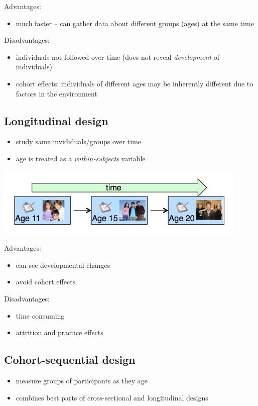 \documentclass[11pt]{article}
\begin{document}
Advantages:
\begin{itemize}
\item much faster -- can gather data about different groups (ages) at the same time
\end{itemize}

Disadvantages:
\begin{itemize}
\item individuals not followed over time (does not reveal \emph{development} of individuals)
\item cohort effects: individuals of different ages may be inherently different due to factors in the environment
\end{itemize}

\subsection*{Longitudinal design}
\label{sec-1-2}
\begin{itemize}
\item study same invididuals/groups over time
\item age is treated as a \emph{within-subjects} variable
\end{itemize}

\includegraphics[width=.9\linewidth]{figures/long.jpg}

Advantages:
\begin{itemize}
\item can see developmental changes
\item avoid cohort effects
\end{itemize}

Disadvantages:
\begin{itemize}
\item time consuming
\item attrition and practice effects
\end{itemize}

\subsection*{Cohort-sequential design}
\label{sec-1-3}
\begin{itemize}
\item measure groups of participants as they age
\item combines best parts of cross-sectional and longitudinal designs
\end{itemize}
\end{document}
